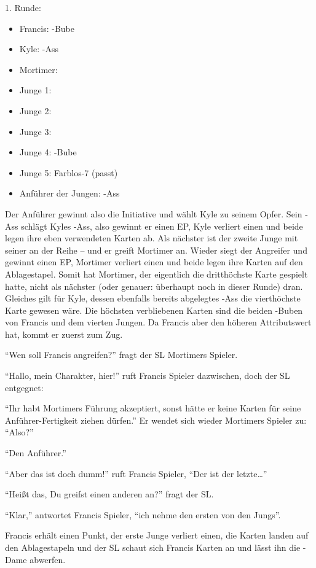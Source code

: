 1. Runde:
\begin {itemize}
\item Francis: \pik-Bube
\item Kyle: \karo-Ass
\item Mortimer: 
\item Junge 1: 
\item Junge 2: 
\item Junge 3: 
\item Junge 4: \pik-Bube
\item Junge 5: Farblos-7 (passt)
\item Anführer der Jungen: \kreuz-Ass
\end {itemize}

Der Anführer gewinnt also die Initiative und wählt Kyle zu seinem Opfer. Sein \kreuz-Ass schlägt Kyles \karo-Ass, also gewinnt er einen EP, Kyle verliert einen und beide legen ihre eben verwendeten Karten ab. Als nächster ist der zweite Junge mit seiner  an der Reihe -- und er greift Mortimer an. Wieder siegt der Angreifer und gewinnt einen EP, Mortimer verliert einen und beide legen ihre Karten auf den Ablagestapel. Somit hat Mortimer, der eigentlich die dritthöchste Karte gespielt hatte, nicht als nächster (oder genauer: überhaupt noch in dieser Runde) dran. Gleiches gilt für Kyle, dessen ebenfalls bereits abgelegtes \karo-Ass die vierthöchste Karte gewesen wäre. Die höchsten verbliebenen Karten sind die beiden \pik-Buben von Francis und dem vierten Jungen. Da Francis aber den höheren Attributswert hat, kommt er zuerst zum Zug.

"`Wen soll Francis angreifen?"' fragt der SL Mortimers Spieler.

"`Hallo, mein Charakter, hier!"' ruft Francis Spieler dazwischen, doch der SL entgegnet:

"`Ihr habt Mortimers Führung akzeptiert, sonst hätte er keine Karten für seine Anführer-Fertigkeit ziehen dürfen."' Er wendet sich wieder Mortimers Spieler zu: "`Also?"'

"`Den Anführer."'

"`Aber das ist doch dumm!"' ruft Francis Spieler, "`Der ist der letzte\dots"' 

"`Heißt das, Du greifst einen anderen an?"' fragt der SL.

"`Klar,"' antwortet Francis Spieler, "`ich nehme den ersten von den Jungs"'.

Francis erhält einen Punkt, der erste Junge verliert einen, die Karten landen auf den Ablagestapeln und der SL schaut sich Francis Karten an und lässt ihn die \kreuz-Dame abwerfen.

